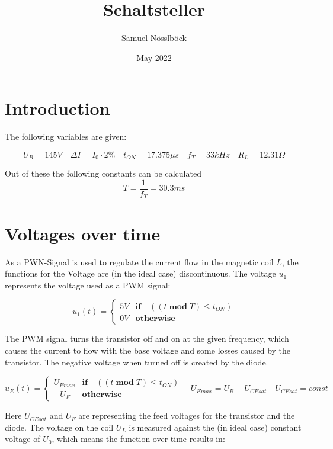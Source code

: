 \documentclass{article}
\title{Schaltsteller}
\author{Samuel Nösslböck}
\date{May 2022}
\newcommand{\ifcases}[1]{\left\{\begin{array}{cc}#1\end{array}\right.}
\begin{document}
\maketitle

\section{Introduction}

    The following variables are given:
    
    \[
     U_B = 145V \quad \Delta I = I_0 \cdot 2\% \quad t_{ON} = 17.375\mu s \quad f_T = 33kHz \quad R_L = 12.31\Omega 
    \]
    
    Out of these the following constants can be calculated
    \[
    T = \frac{1}{f_T} = 30.3ms
    \]

\section {Voltages over time}

    As a PWN-Signal is used to regulate the current flow in the magnetic coil $L$, the functions for the Voltage are (in the ideal case) discontinuous. 
    The voltage $u_1$ represents the voltage used as a PWM signal:
    
    \begin{equation}
        u_1(t) = \ifcases{5V & \textbf{if}\quad ((t\;\textbf{mod}\; T) \leq t_{ON}) \\ 0V & \textbf{otherwise}}
    \end{equation}
    
    The PWM signal turns the transistor off and on at the given frequency, which causes the current to flow with the base voltage and some losses caused by the transistor. The negative voltage when turned off is created by the diode.
    
    \begin{equation}
        u_E(t) = \ifcases{U_{Emax} & \textbf{if}\quad ((t\;\textbf{mod}\; T) \leq t_{ON}) \\-U_F & \textbf{otherwise}} \quad U_{Emax} = U_B - U_{CEsat} \quad U_{CEsat} = const
    \end{equation}
    
    Here $U_{CEsat}$ and $U_F$ are representing the feed voltages for the transistor and the diode. The voltage on the coil $U_L$ is measured against the (in ideal case) constant voltage of $U_0$, which means the function over time results in: 
    
\end{document}
